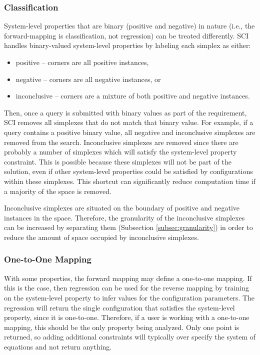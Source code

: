    \subsubsection{Classification}
System-level properties that are binary (positive and negative) in nature (i.e., the forward-mapping is classification, not regression) can be treated differently.
SCI handles binary-valued system-level properties by labeling each simplex as either:
\begin{itemize}
\item positive -- corners are all positive instances,
\item negative -- corners are all negative instances, or
\item inconclusive -- corners are a mixture of both positive and negative instances.
\end{itemize}
Then, once a query is submitted with binary values as part of the requirement, SCI removes all simplexes that do not match that binary value.
For example, if a query contains a positive binary value, all negative and inconclusive simplexes are removed from the search.
Inconclusive simplexes are removed since there are probably a number of simplexes which will satisfy the system-level property constraint.
This is possible because these simplexes will not be part of the solution, even if other system-level properties could be satisfied by configurations within these simplexes.
This shortcut can significantly reduce computation time if a majority of the space is removed.

Inconclusive simplexes are situated on the boundary of positive and negative instances in the space.
Therefore, the granularity of the inconclusive simplexes can be increased by separating them (Subsection \ref{subsec:granularity}) in order to reduce the amount of space occupied by inconclusive simplexes.


   \subsubsection{One-to-One Mapping}
With some properties, the forward mapping may define a one-to-one mapping.
If this is the case, then regression can be used for the reverse mapping by training on the system-level property to infer values for the configuration parameters.
The regression will return the single configuration that satisfies the system-level property, since it is one-to-one.
Therefore, if a user is working with a one-to-one mapping, this should be the only property being analyzed.
Only one point is returned, so adding additional constraints will typically over specify the system of equations and not return anything.

